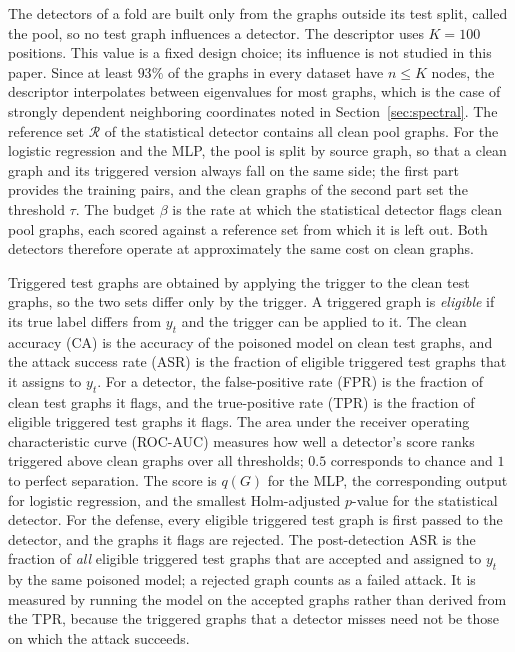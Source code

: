 \documentclass[journal]{IEEEtran}
\newcommand{\calR}{\mathcal{R}}         %
\begin{document}
The detectors of a fold are built only from the graphs outside
its test split, called the pool, so no test graph influences a detector. The
descriptor uses $K=100$ positions. This value is a fixed design choice; its
influence is not studied in this paper. Since at least $93\%$ of the graphs in
every dataset have $n\le K$ nodes, the descriptor interpolates between
eigenvalues for most graphs, which is the case of strongly dependent
neighboring coordinates noted in Section~\ref{sec:spectral}. The reference set
$\calR$ of the statistical detector contains all clean pool graphs. For the
logistic regression and the MLP, the pool is split by source graph, so that a
clean graph and its triggered version always fall on the same side; the first
part provides the training pairs, and the clean graphs of the second part set
the threshold $\tau$. The budget $\beta$ is the rate at which the statistical
detector flags clean pool graphs, each scored against a reference set from
which it is left out. Both detectors therefore operate at approximately the
same cost on clean graphs.

Triggered test graphs are obtained by applying the trigger to
the clean test graphs, so the two sets differ only by the trigger. A triggered
graph is \emph{eligible} if its true label differs from $y_t$ and the trigger
can be applied to it. The clean accuracy (CA) is the accuracy of the poisoned
model on clean test graphs, and the attack success rate (ASR) is the fraction
of eligible triggered test graphs that it assigns to $y_t$. For a detector, the
false-positive rate (FPR) is the fraction of clean test graphs it flags, and
the true-positive rate (TPR) is the fraction of eligible triggered test graphs
it flags. The area under the receiver operating characteristic curve
(ROC-AUC) measures how well a detector's score ranks triggered above clean
graphs over all thresholds; $0.5$ corresponds to chance and $1$ to perfect
separation. The score is $q(G)$ for the MLP, the corresponding output for
logistic regression, and the smallest Holm-adjusted $p$-value for the
statistical detector. For the defense, every eligible triggered test graph is
first passed to the detector, and the graphs it flags are rejected. The
post-detection ASR is the fraction of \emph{all} eligible triggered test graphs
that are accepted and assigned to $y_t$ by the same poisoned model; a rejected
graph counts as a failed attack. It is measured by running the model on the
accepted graphs rather than derived from the TPR, because the triggered graphs
that a detector misses need not be those on which the attack succeeds.
\end{document}
